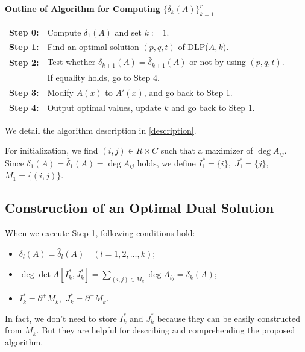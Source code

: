 \vspace{0.5zw}

\noindent
{\bf Outline of Algorithm for Computing} $ \{ \delta_k (A) \}_{k=1}^r $\\
\begin{tabular}{ll}
{\bf Step 0:} & Compute $ \delta_1 (A) $ and set $k:=1$.\\
{\bf Step 1:} & Find an optimal solution $(p,q,t)$ of DLP($A,k$).\\
{\bf Step 2:} & Test whether $ \delta_{k+1} (A) = \hat{\delta}_{k+1} (A) $ or not by using $(p,q,t)$. \\
              & If equality holds, go to Step 4.\\
{\bf Step 3:} & Modify $ A(x) $ to $ A' (x) $, and go back to Step 1. \\
{\bf Step 4:} & Output optimal values, update $k$ and go back to Step 1. \\
\end{tabular}
\vspace{0.5zw}

We detail the algorithm description in \ref{description}.

For initialization, we find $ (i,j) \in R \times C $ such that a maximizer of $ \deg A_{ij} $. 
Since $ \delta_1 (A) = \hat{ \delta}_1 (A) = \deg A_{ij} $ holds, 
we define $ I^{\ast}_1 = \{ i \}, $ $J^{\ast}_1 =\{ j \},$ $M_1 = \{ (i,j) \} $. 


\subsection{Construction of an Optimal Dual Solution}
\label{dual}
When we execute Step 1, following conditions hold:
\begin{itemize}
\item $ \delta_l (A) = \hat{ \delta }_l (A) \quad ( l = 1,2,\dots ,k)$;
\item $ \deg \det A [I^{\ast}_k , J^{\ast}_k] = \sum_{ (i,j) \in M_k } \deg A_{ij} = \delta_k (A)$;
\item $ I^{\ast}_k = \partial^+ M_k ,$ $ J^{\ast}_k = \partial^- M_k $.
\end{itemize}
In fact, we don't need to store $ I^{\ast}_k $ and $ J^{\ast}_k $ 
because they can be easily constructed from $M_k$.
But they are helpful for describing and comprehending the proposed algorithm.

